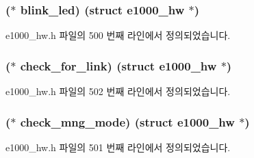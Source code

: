 \subsubsection[{\texorpdfstring{blink\+\_\+led}{blink_led}}]{($\ast$ blink\+\_\+led) (struct {\bf e1000\+\_\+hw} $\ast$)}\hypertarget{structe1000__mac__operations_a596f43879eddf519677bea12106e88dd}{}\label{structe1000__mac__operations_a596f43879eddf519677bea12106e88dd}


e1000\+\_\+hw.\+h 파일의 500 번째 라인에서 정의되었습니다.

\subsubsection[{\texorpdfstring{check\+\_\+for\+\_\+link}{check_for_link}}]{($\ast$ check\+\_\+for\+\_\+link) (struct {\bf e1000\+\_\+hw} $\ast$)}\hypertarget{structe1000__mac__operations_a310026518db7151bd668f9751f30f719}{}\label{structe1000__mac__operations_a310026518db7151bd668f9751f30f719}


e1000\+\_\+hw.\+h 파일의 502 번째 라인에서 정의되었습니다.

\subsubsection[{\texorpdfstring{check\+\_\+mng\+\_\+mode}{check_mng_mode}}]{($\ast$ check\+\_\+mng\+\_\+mode) (struct {\bf e1000\+\_\+hw} $\ast$)}\hypertarget{structe1000__mac__operations_ab5e076892629efd80daf8b037d216ef2}{}\label{structe1000__mac__operations_ab5e076892629efd80daf8b037d216ef2}


e1000\+\_\+hw.\+h 파일의 501 번째 라인에서 정의되었습니다.

